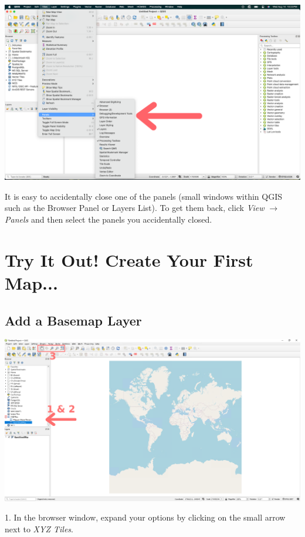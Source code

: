 \documentclass[oneside,a4paper,11pt,explicit]{book}
\begin{document}
\centerline{\includegraphics[width=\textwidth]{LostPanels.png}}

\vspace{.5em}

It is easy to accidentally close one of the panels (small windows within QGIS such as the Browser Panel or Layers List). To get them back, click \textit{View} $\rightarrow$ \textit{Panels} and then select the panels you accidentally closed.

\section{Try It Out! Create Your First Map...}

\subsection{Add a Basemap Layer}

\centerline{\includegraphics[width=\textwidth]{QGISbasemap.png}}

1. In the browser window, expand your options by clicking on the small arrow next to \textit{XYZ Tiles}.
\end{document}
